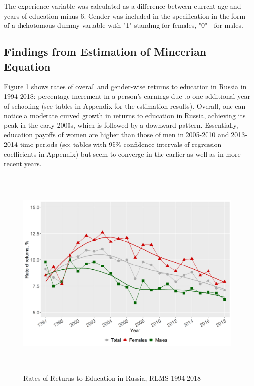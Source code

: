 \documentclass[12pt,a4paper]{article}
\numberwithin{equation}{section}
\begin{document}
The experience variable was calculated as a difference between current age and years of education minus 6. Gender was included in the specification in the form of a dichotomous dummy variable with "1" standing for females, "0" - for males.

\subsection*{Findings from Estimation of Mincerian Equation}

Figure \ref{fig:1} shows rates of overall and gender-wise returns to education in Russia in 1994-2018: percentage increment in a person's earnings due to one additional year of schooling (see tables in Appendix for the estimation results). Overall, one can notice a moderate curved growth in returns to education in Russia, achieving its peak in the early 2000s, which is followed by a downward pattern. Essentially, education payoffs of women are higher than those of men in 2005-2010 and 2013-2014 time periods (see tables with 95\% confidence intervals of regression coefficients in Appendix) but seem to converge in the earlier as well as in more recent years.

\begin{figure}[H]
 \centering
 \includegraphics[width=\textwidth, height=300pt]{re_edu.png}
 \caption{Rates of Returns to Education in Russia, RLMS 1994-2018}\label{fig:1}
\end{figure}
\end{document}
